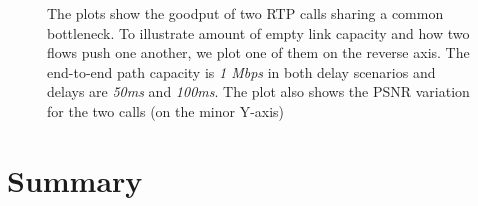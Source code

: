 \begin{figure}
\caption{The plots show the goodput of two RTP calls sharing a common
bottleneck. To illustrate amount of empty link capacity and how two flows push
one another, we plot one of them on the reverse axis. The end-to-end path
capacity is \emph{1 Mbps} in both delay scenarios and delays are \emph{50ms}
and \emph{100ms}. The plot also shows the PSNR variation for the two calls (on
the minor Y-axis)}
\label{fig:fecrc-dnet}
\end{figure}


\section{Summary}

